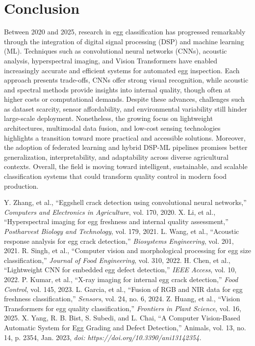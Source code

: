 \documentclass[conference]{IEEEtran}
\begin{document}
	\section{Conclusion}
	Between 2020 and 2025, research in egg classification has progressed remarkably through the integration of digital signal processing (DSP) and machine learning (ML). Techniques such as convolutional neural networks (CNNs), acoustic analysis, hyperspectral imaging, and Vision Transformers have enabled increasingly accurate and efficient systems for automated egg inspection. Each approach presents trade-offs, CNNs offer strong visual recognition, while acoustic and spectral methods provide insights into internal quality, though often at higher costs or computational demands. Despite these advances, challenges such as dataset scarcity, sensor affordability, and environmental variability still hinder large-scale deployment. Nonetheless, the growing focus on lightweight architectures, multimodal data fusion, and low-cost sensing technologies highlights a transition toward more practical and accessible solutions. Moreover, the adoption of federated learning and hybrid DSP-ML pipelines promises better generalization, interpretability, and adaptability across diverse agricultural contexts. Overall, the field is moving toward intelligent, sustainable, and scalable classification systems that could transform quality control in modern food production.
	
	\begin{thebibliography}{00}
		 Y. Zhang, et al., ``Eggshell crack detection using convolutional neural networks,'' \textit{Computers and Electronics in Agriculture}, vol. 170, 2020.
		 X. Li, et al., ``Hyperspectral imaging for egg freshness and internal quality assessment,'' \textit{Postharvest Biology and Technology}, vol. 179, 2021.
		 L. Wang, et al., ``Acoustic response analysis for egg crack detection,'' \textit{Biosystems Engineering}, vol. 201, 2021.
		 R. Singh, et al., ``Computer vision and morphological processing for egg size classification,'' \textit{Journal of Food Engineering}, vol. 310, 2022.
		 H. Chen, et al., ``Lightweight CNN for embedded egg defect detection,'' \textit{IEEE Access}, vol. 10, 2022.
		 P. Kumar, et al., ``X-ray imaging for internal egg crack detection,'' \textit{Food Control}, vol. 145, 2023.
		 L. Garcia, et al., ``Fusion of RGB and NIR data for egg freshness classification,'' \textit{Sensors}, vol. 24, no. 6, 2024.
		 Z. Huang, et al., ``Vision Transformers for egg quality classification,'' \textit{Frontiers in Plant Science}, vol. 16, 2025.
		 X. Yang, R. B. Bist, S. Subedi, and L. Chai, “A Computer Vision-Based Automatic System for Egg Grading and Defect Detection,” Animals, vol. 13, no. 14, p. 2354, Jan. 2023, \textit{doi: https://doi.org/10.3390/ani13142354.}
	\end{thebibliography}
	
\end{document}
